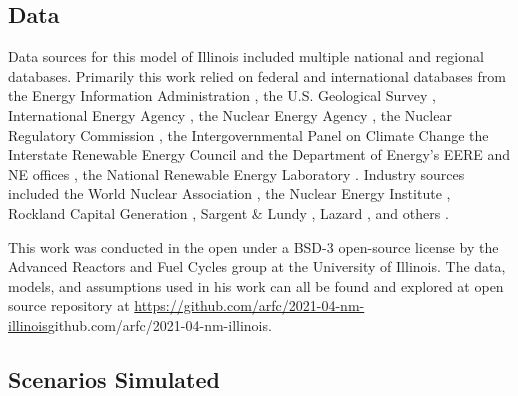 \FloatBarrier
\subsection{Data}
Data sources for this model of Illinois included multiple national and regional 
databases. Primarily this work relied on federal and international databases from the 
Energy Information Administration 
\cite{us_energy_information_administration_eia_preliminary_2021,energy_information_administration_state_2020,us_energy_information_administration_eia_electric_2021,us_energy_information_administration_eia_illinois_2020}, 
the U.S. Geological Survey \cite{hoen_united_2018}, 
International Energy Agency \cite{lorenczik_projected_2020}, 
the Nuclear Energy Agency \cite{crozat_full_2018}
, the Nuclear Regulatory Commission \cite{united_states_nuclear_regulatory_commission_illinois_2020}, 
the Intergovernmental Panel on Climate Change 
\cite{intergovernmental_panel_on_climate_change_annex_2014,intergovernmental_panel_on_climate_change_climate_2014,intergovernmental_panel_on_climate_change_climate_2014-1,intergovernmental_panel_on_climate_change_climate_2014-2}
the Interstate Renewable Energy Council 
\cite{sherwood_us_2009,sherwood_us_2010,sherwood_us_2011,brown_solid_1996,sherwood_us_2012,sherwood_us_2013,sherwood_us_2014}
and the Department of Energy's EERE and NE offices 
\cite{us_department_of_energy_capital_2016}, the National Renewable Energy 
Laboratory \cite{nrel_national_renewable_energy_laboratory_2020_2020}.
Industry sources included the World Nuclear Association
\cite{world_nuclear_association_nuclear_2017}
, 
the Nuclear Energy Institute 
\cite{desai_nuclear_2018,desai_nuclear_2020,murphy_impacts_2019,tessum_air_2019},
Rockland Capital Generation \cite{rockland_capital_natural_2021},
Sargent \& Lundy \cite{sargent__lundy_capital_2020}, 
Lazard \cite{ray_lazards_2020},
and others 
\cite{the_solar_foundation_national_2020,solar_energy_industries_association_illinois_2020,rutovitz_calculating_2015}.


This work was conducted in the open under a BSD-3 open-source license by the 
Advanced Reactors and Fuel Cycles group at the University of Illinois. The 
data, models, and assumptions used in his work can all be found and explored at 
open source repository at 
\url{https://github.com/arfc/2021-04-nm-illinois}{github.com/arfc/2021-04-nm-illinois}.

\FloatBarrier
\subsection{Scenarios Simulated}\label{sec:simulations}

